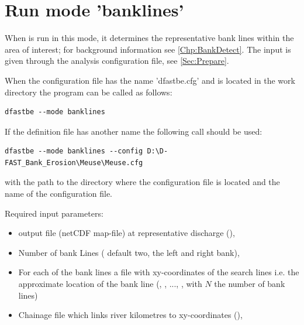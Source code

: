 
\section{Run mode 'banklines'} \label{Sec:rundetect}

When \dfastbe is run in this mode, it determines the representative bank lines within the area of interest; for background information see \autoref{Chp:BankDetect}.
The input is given through the analysis configuration file, see \autoref{Sec:Prepare}.

When the configuration file has the name 'dfastbe.cfg' and is located in the work directory the program can be called as follows:

\begin{Verbatim}
dfastbe --mode banklines
\end{Verbatim}

If the definition file has another name the following call should be used:

\begin{Verbatim}
dfastbe --mode banklines --config D:\D-FAST_Bank_Erosion\Meuse\Meuse.cfg
\end{Verbatim}

with  the path to the directory where the configuration file is located and  the name of the configuration file.

Required input parameters:

\begin{itemize}
\item \dflowfm output file (netCDF map-file) at representative discharge (),
\item Number of bank Lines ( default two, the left and right bank),
\item For each of the bank lines a file with xy-coordinates of the search lines i.e. the approximate location of the bank line (, , ..., , with $N$ the number of bank lines)
\item Chainage file which links river kilometres to xy-coordinates (),
\end{itemize}

